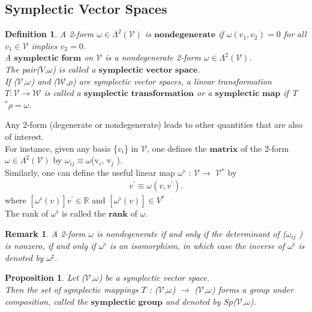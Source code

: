 \documentclass[12pt,a4paper]{article}
\newtheorem{rem}[thm]{Remark}
\newtheorem{defn}[thm]{Definition}
\newtheorem{prop}{Proposition}
\begin{document}
\subsection{Symplectic Vector Spaces}

\begin{defn}
A 2-form $\omega \in \Lambda^{2}(\mathcal{V})$ is $\textbf{nondegenerate}$ if $\omega(v_1, v_2) = 0$ for all $v_1 \in \mathcal{V}$ implies $v_2 = 0$. \\
A $\textbf{symplectic form}$ on $\mathcal{V}$ is a nondegenerate 2-form $\omega \in \Lambda^{2}(\mathcal{V})$. 
\\The pair($V$,$\omega$) is called a $\textbf{symplectic vector space}$.\\
If ($\mathcal{V}$,$\omega$) and ($\mathcal{W}$,$\rho$) are symplectic vector spaces, a linear transformation $T:\mathcal{V} \to \mathcal{W}$ is called a $\textbf{symplectic transformation}$ or a $\textbf{symplectic map}$ if T$^* \rho = \omega$.
\end{defn}

Any 2-form (degenerate or nondegenerate) leads to other quantities that
are also of interest. \\
For instance, given any basis \{$v_i$\} in $\mathcal{V}$, one defines the
$\textbf{matrix}$ of the 2-form $\omega \in \Lambda^{2}(\mathcal{V})$ by $\omega_{ij} \equiv \omega$(v$_i$, v$_j$ ). \\Similarly, one can
define the useful linear map $\omega^{\flat}$ : $\mathcal{V}$$\to$ $\mathcal{V}$$^*$ by
\begin{align*}
 [ \omega^{\flat} (v) ] v^{'} \equiv \omega(v, v^{'}).
\end{align*}
 where $ [ \omega^{\flat} (v) ] v^{'} \in \mathbb{R}$ and  $ [ \omega^{\flat} (v) ] \in V^{*}$\\
The rank of $\omega^{\flat}$ is called the $\textbf{rank}$ of $\omega$.
\begin{rem}
A 2-form $\omega$ is nondegenerate if and only if the determinant of ($\omega_{ij}$ ) is nonzero, if and only if $\omega^{\flat}$ is an isomorphism, in which
case the inverse of $\omega^{\flat}$ is denoted by $\omega^{\sharp}$.
\end{rem}
\begin{prop}
Let ($\mathcal{V}$,$\omega$) be a symplectic vector space. \\Then the set of
symplectic mappings $T$ : ($\mathcal{V}$,$\omega$) $\to$ ($\mathcal{V}$,$\omega$) forms a group under composition,
called the $\textbf{symplectic group}$ and denoted by $Sp$($\mathcal{V}$,$\omega$).
\end{prop}
\end{document}
